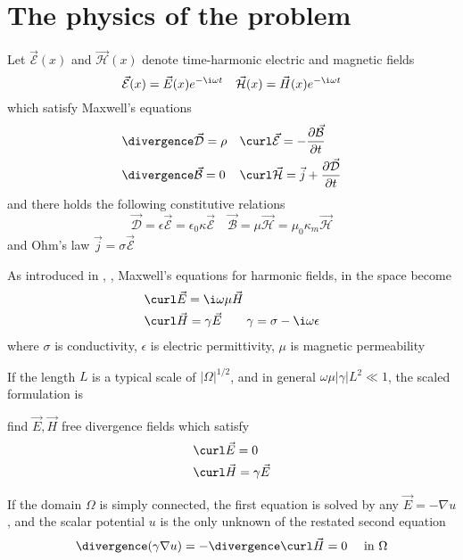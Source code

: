 \section{The physics of the problem}
Let $\vec{\mathcal{E}}(x)$ and $\vec{\mathcal{H}}(x)$ denote time-harmonic electric and magnetic fields
\begin{equation}
 \vec{\mathcal{E}}(x) = \vec{E}(x)e^{-\i\omega t}\quad\vec{\mathcal{H}}(x)=\vec{H}(x)e^{-\i\omega t}
\end{equation}
which satisfy Maxwell's equations
\begin{align}
&\divergence \vec{\mathcal{D}} = \rho &&\curl\vec{\mathcal{E}} = -\frac{\partial\vec{\mathcal{B}}}{\partial t} \\
&\divergence \vec{\mathcal{B}} = 0 &&\curl\vec{\mathcal{H}} = \vec{j} +\frac{\partial\vec{\mathcal{D}}}{\partial t}
\end{align}
and there holds the following constitutive relations
\begin{equation}
 \vec{\mathcal{D}} = \epsilon \vec{\mathcal{E}} = \epsilon_0\kappa\vec{\mathcal{E}}\quad \vec{\mathcal{B}} =\mu\vec{\mathcal{H}} = \mu_0\kappa_m\vec{\mathcal{H}}
\end{equation}
and Ohm's law $\vec{j} = \sigma \vec{\mathcal{E}}$
\par
As introduced in \cite{kirsch:book}, \cite{borcea:eit}, Maxwell's equations for harmonic fields, in the space become
\begin{align}
 &\curl\vec{E} = \i\omega\mu\vec{H} \\
 &\curl\vec{H} = \gamma\vec{E} \quad\quad \gamma =\sigma -\i\omega\epsilon
\end{align}
where $\sigma$ is conductivity, $\epsilon$ is electric permittivity, $\mu$ is magnetic permeability
\par
If the length $L$ is a typical scale of $|\Omega|^{1/2}$, and in general $\omega\mu|\gamma| L^2 \ll 1$, the scaled formulation is
\begin{center}
 find $\vec{E}, \vec{H}$ free divergence fields which satisfy
 \begin{align}
  &\curl\vec{E} = 0 \\
  &\curl\vec{H} = \gamma \vec{E}
 \end{align}
\end{center}
If the domain $\Omega$ is simply connected, the first equation is solved by any $\vec{E} = -\nabla u$, and the scalar potential $u$ is the only unknown of the restated second equation
\begin{equation}
 \divergence(\gamma\nabla u) = - \divergence\curl \vec{H} = 0\quad \textup{ in }\Omega
\end{equation}
